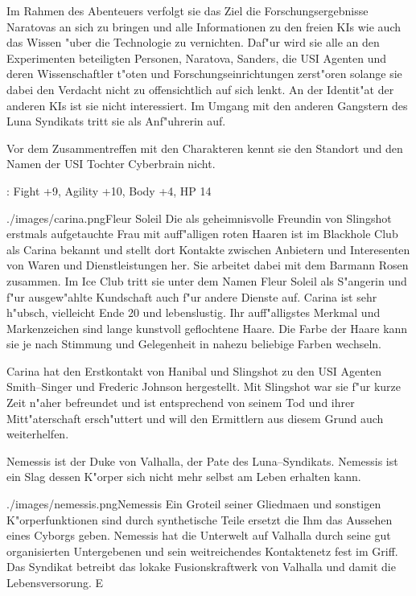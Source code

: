 Im Rahmen des Abenteuers verfolgt sie das Ziel die Forschungsergebnisse Naratovas an sich zu bringen und alle Informationen zu den freien KIs wie auch das Wissen "uber die Technologie zu vernichten. Daf"ur wird sie alle an den Experimenten beteiligten Personen, Naratova, Sanders, die USI Agenten und deren Wissenschaftler t"oten und Forschungseinrichtungen zerst"oren solange sie dabei den Verdacht nicht zu offensichtlich auf sich lenkt. An der Identit"at der anderen KIs ist sie nicht interessiert. Im Umgang mit den anderen  Gangstern des Luna Syndikats tritt sie als Anf"uhrerin auf.

Vor dem Zusammentreffen mit den Charakteren kennt sie den Standort und den Namen der USI Tochter Cyberbrain nicht.

  : Fight +9, Agility +10, Body +4, HP 14


\begin{sideimagebox}[r]{0.5}{./images/carina.png}{Fleur Soleil}
    Die als geheimnisvolle Freundin von Slingshot erstmals aufgetauchte Frau mit auff"alligen roten Haaren ist im Blackhole Club als Carina bekannt und stellt dort Kontakte zwischen Anbietern und Interesenten von Waren und Dienstleistungen her. Sie arbeitet dabei mit dem Barmann Rosen zusammen. Im Ice Club tritt sie unter dem Namen Fleur Soleil als S"angerin und f"ur ausgew"ahlte Kundschaft auch f"ur andere Dienste auf. Carina ist sehr h"ubsch, vielleicht Ende 20 und lebenslustig. Ihr auff"alligstes Merkmal und Markenzeichen sind lange kunstvoll geflochtene Haare. Die Farbe der Haare kann sie je nach Stimmung und Gelegenheit in nahezu beliebige Farben wechseln.

    Carina hat den Erstkontakt von Hanibal und Slingshot zu den USI Agenten Smith--Singer und Frederic Johnson hergestellt. Mit Slingshot war sie f"ur kurze Zeit n"aher befreundet und ist entsprechend von seinem Tod und ihrer Mitt"aterschaft ersch"uttert und will den Ermittlern aus diesem Grund auch weiterhelfen.
\end{sideimagebox}


Nemessis ist der Duke von Valhalla, der Pate des Luna--Syndikats. Nemessis ist ein Slag dessen K"orper sich nicht mehr selbst am Leben erhalten kann. 

\begin{sideimagebox}[r]{0.7}{./images/nemessis.png}{Nemessis}
    Ein Gro\3teil seiner Gliedma\3en und sonstigen K"orperfunktionen sind durch synthetische Teile ersetzt die Ihm das Aussehen eines Cyborgs geben. Nemessis hat die Unterwelt auf Valhalla durch seine gut organisierten Untergebenen und sein weitreichendes Kontaktenetz
    fest im Griff. Das Syndikat betreibt das lokake Fusionskraftwerk von Valhalla und damit die Lebensversorung. E
\end{sideimagebox}

